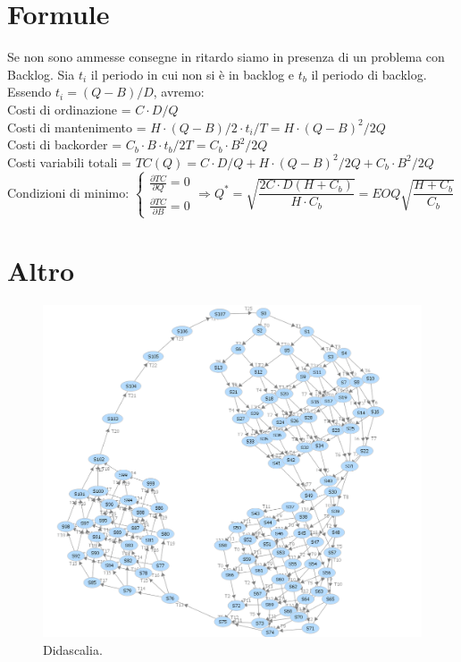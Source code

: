 \section{Formule}
Se non sono ammesse consegne in ritardo siamo in presenza di un problema con Backlog. Sia $ t_{i} $ il periodo in cui non si è in backlog e $ t_{b} $ il periodo di backlog. Essendo $ t_{i}=(Q-B)/D $, avremo:\\
Costi di ordinazione = $C\cdot D/Q$\\
Costi di mantenimento = $ H\cdot (Q-B)/2\cdot t_{i}/T=H\cdot (Q-B)^{2}/2Q $\\
Costi di backorder = $ C_{b}\cdot B\cdot t_{b}/2T=C_{b}\cdot B^{2}/2Q $\\
Costi variabili totali = $ TC(Q)=C\cdot D/Q+H\cdot (Q-B)^{2}/2Q+C_{b}\cdot B^{2}/2Q $\\
Condizioni di minimo: 
$\begin{cases}
\frac{\partial TC}{\partial Q}=0\\\frac{\partial TC}{\partial B}=0
\end{cases}
\Rightarrow
Q^{\ast}=\sqrt{\dfrac{2C\cdot D(H+C_{b})}{H\cdot C_{b}}}=EOQ\sqrt{\dfrac{H+C_{b}}{C_{b}}}
$

\section{Altro}
\begin{figure}[H]
\centering
\includegraphics[width=1\textwidth]{grafo.png}
\caption{\label{fig:1}Didascalia.}
\end{figure}
